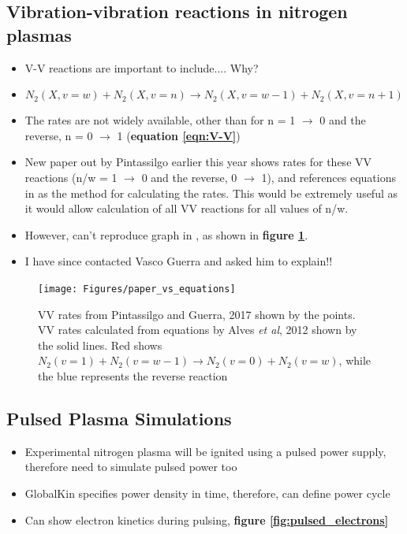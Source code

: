 \documentclass[11pt, oneside]{article}   	%
\begin{document}
\subsection{Vibration-vibration reactions in nitrogen plasmas}
\begin{itemize}
\item V-V reactions are important to include.... Why?
\item \begin{equation} N_2(X,v=w) + N_2 (X,v=n) \rightarrow N_2(X,v=w-1) + N_2(X,v=n+1)
\label{eqn:V-V} \end{equation}
\item The rates are not widely available, other than for n = 1 $\rightarrow$ 0 and the reverse, n = 0 $\rightarrow$ 1 (\textbf{equation \ref{eqn:V-V}})
\item New paper out by Pintassilgo \cite{Pintassilgo2017modelling} earlier this year shows rates for these VV reactions (n/w = 1 $\rightarrow$ 0 and the reverse, 0 $\rightarrow$ 1), and references equations in \cite{Alves2012capacitively} as the method for calculating the rates.
This would be extremely useful as it would allow calculation of all VV reactions for all values of n/w.
\item However, can't reproduce graph in \cite{Pintassilgo2017modelling}, as shown in \textbf{figure \ref{fig:paper_vs_equations}}.
\item I have since contacted Vasco Guerra and asked him to explain!!
\end{itemize}

\begin{figure}
\texttt{[image: Figures/paper\_vs\_equations]}
\caption{VV rates from Pintassilgo and Guerra, 2017 \cite{Pintassilgo2017modelling} shown by the points. VV rates calculated from equations by Alves \textit{et al}, 2012 \cite{Alves2012capacitively} shown by the solid lines. Red shows $N_2(v=1) + N_2(v=w-1) \rightarrow N_2(v=0) + N_2(v=w)$, while the blue represents the reverse reaction}
\label{fig:paper_vs_equations}
\end{figure}

\subsection{Pulsed Plasma Simulations}

\begin{itemize}
\item Experimental nitrogen plasma will be ignited using a pulsed power supply, therefore need to simulate pulsed power too
\item GlobalKin specifies power density in time, therefore, can define power cycle
\item Can show electron kinetics during pulsing, \textbf{figure \ref{fig:pulsed_electrons}}
\end{itemize}
\end{document}
